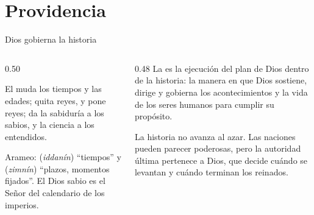 \section{Providencia}

\begin{frame}{Dios gobierna la historia}
\begin{columns}[t,onlytextwidth]
\begin{column}{0.50\textwidth}
\begin{cita}El muda los tiempos y las edades; quita reyes, y pone reyes; da la sabiduría a los sabios, y la ciencia a los entendidos.\end{cita}
\begin{center}\end{center}
\scriptsize Arameo:  (\emph{iddanín}) ``tiempos'' y  (\emph{zimnín}) ``plazos, momentos fijados''. El Dios sabio es el Señor del calendario de los imperios.
\end{column}
\begin{column}{0.48\textwidth}\small
La  es la ejecución del plan de Dios dentro de la historia: la manera en que Dios sostiene, dirige y gobierna los acontecimientos y la vida de los seres humanos para cumplir su propósito.\par\medskip
La historia no avanza al azar. Las naciones pueden parecer poderosas, pero la autoridad última pertenece a Dios, que decide cuándo se levantan y cuándo terminan los reinados.
\end{column}
\end{columns}
\end{frame}

